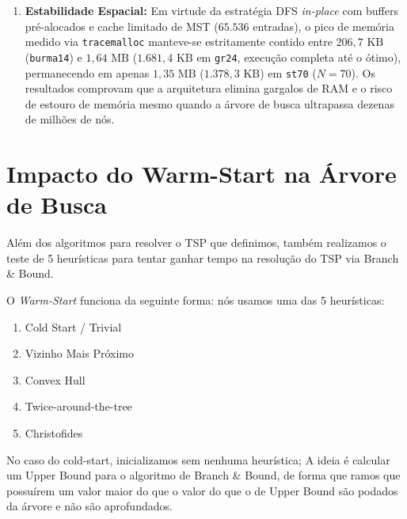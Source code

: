 \documentclass[12pt]{article}
\begin{document}
\begin{enumerate}
    \item \textbf{Estabilidade Espacial:} Em virtude da estratégia DFS \textit{in-place} com buffers pré-alocados e cache limitado de MST ($65.536$ entradas), o pico de memória medido via \texttt{tracemalloc} manteve-se estritamente contido entre $206{,}7\text{ KB}$ (\texttt{burma14}) e $1{,}64\text{ MB}$ ($1.681{,}4\text{ KB}$ em \texttt{gr24}, execução completa até o ótimo), permanecendo em apenas $1{,}35\text{ MB}$ ($1.378{,}3\text{ KB}$) em \texttt{st70} ($N=70$). Os resultados comprovam que a arquitetura elimina gargalos de RAM e o risco de estouro de memória mesmo quando a árvore de busca ultrapassa dezenas de milhões de nós.
\end{enumerate}

\section{Impacto do Warm-Start na Árvore de Busca}
Além dos algoritmos para resolver o TSP que definimos, também realizamos o teste de 5 heurísticas para tentar ganhar tempo na resolução do TSP via Branch \& Bound.

O \textit{Warm-Start} funciona da seguinte forma: nós usamos uma das 5 heurísticas:
\begin{enumerate} 
    \item Cold Start / Trivial
    \item Vizinho Mais Próximo
    \item Convex Hull
    \item Twice-around-the-tree
    \item Christofides
\end{enumerate}

No caso do cold-start, inicializamos sem nenhuma heurística; A ideia é calcular um Upper Bound para o algoritmo de Branch \& Bound, de forma que ramos que possuírem um valor maior do que o valor do que o de Upper Bound são podados da árvore e não são aprofundados.
\end{document}
